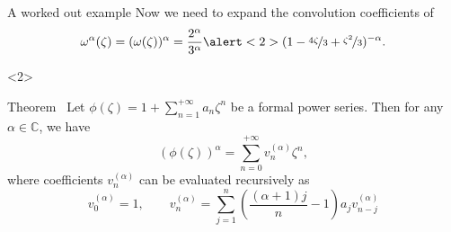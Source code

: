 \documentclass[aspectratio=169,xcolor=dvipsnames]{beamer}
\begin{document}
\begin{frame}{A worked out example}
Now we need to expand the convolution coefficients of \[\omega^\alpha(\zeta) = (\omega(\zeta))^\alpha = \frac{2^\alpha}{3^\alpha}\alert<2>{(1 - \nicefrac{4\zeta}{3} + \nicefrac{\zeta^2}{3})^{-\alpha}}.\]
\begin{onlyenv}<2>
\begin{alertblock}{Theorem~\parencite[Theorem 1.6c, p. 42]{HenriciBook}}\small
	Let $\phi(\zeta) = 1 + \sum_{n=1}^{+\infty} a_n \zeta^n$ be a formal power series. Then for any $\alpha \in \mathbb{C}$, we have\vspace{-0.5em}
	\[
	(\phi(\zeta))^\alpha = \sum_{n=0}^{+\infty} v_n^{(\alpha)} \zeta^n,
	\]
	where coefficients $v_n^{(\alpha)}$ can be evaluated recursively as\vspace{-0.5em}
	\[
	v_0^{(\alpha)} = 1, \qquad v_n^{(\alpha)} = \sum_{j=1}^{n} \left( \frac{(\alpha +1)j}{n} - 1 \right) a_j v_{n-j}^{(\alpha)}
	\]
\end{alertblock}
\end{onlyenv}
\end{frame}
\end{document}
